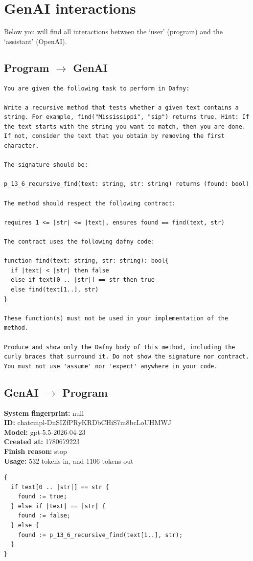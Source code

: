 \documentclass{article}
\begin{document}
\section*{GenAI interactions}
Below you will find all interactions between the `user' (program) and the `assistant' (OpenAI).
\subsection*{Program $\rightarrow$ GenAI}
\begin{lstlisting}
You are given the following task to perform in Dafny:

Write a recursive method that tests whether a given text contains a string. For example, find("Mississippi", "sip") returns true. Hint: If the text starts with the string you want to match, then you are done. If not, consider the text that you obtain by removing the first character.

The signature should be:

p_13_6_recursive_find(text: string, str: string) returns (found: bool)

The method should respect the following contract:

requires 1 <= |str| <= |text|, ensures found == find(text, str)

The contract uses the following dafny code:

function find(text: string, str: string): bool{
  if |text| < |str| then false
  else if text[0 .. |str|] == str then true
  else find(text[1..], str)
}

These function(s) must not be used in your implementation of the method.

Produce and show only the Dafny body of this method, including the curly braces that surround it. Do not show the signature nor contract. You must not use 'assume' nor 'expect' anywhere in your code.
\end{lstlisting}
\subsection*{GenAI $\rightarrow$ Program}
\textbf{System fingerprint: }null
\\\textbf{ID: }chatcmpl-DnSIZfPRyKRDbCHiS7m8bcLoUHMWJ
\\\textbf{Model: }gpt-5.5-2026-04-23
\\\textbf{Created at: }1780679223
\\\textbf{Finish reason: }stop
\\\textbf{Usage: }532 tokens in, and 1106 tokens out
\begin{lstlisting}
{
  if text[0 .. |str|] == str {
    found := true;
  } else if |text| == |str| {
    found := false;
  } else {
    found := p_13_6_recursive_find(text[1..], str);
  }
}
\end{lstlisting}
\end{document}
